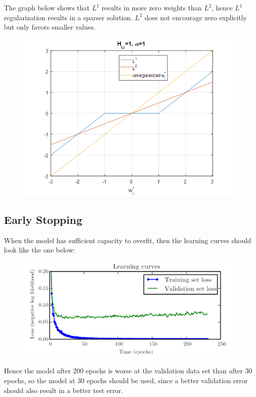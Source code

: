 \begin{multicols}{2}
	The graph below shows that $L^1$ results in more zero weights than $L^2$, hence $L^1$ regularization results in a sparser solution. $L^2$ does not encourage zero explicitly but only favors smaller values.
	\begin{figure}[H]
		\centering
		\includegraphics[width=0.9\linewidth]{images/L1L2.png}
	\end{figure}

	\subsection{Early Stopping}
	When the model has sufficient capacity to overfit, then the learning curves should look like the one below:
	\begin{figure}[H]
		\centering
		\includegraphics[width=0.9\linewidth]{images/earlystopping.png}
	\end{figure}
	Hence the model after 200 epochs is worse at the validation data set than after 30 epochs, so the model at 30 epochs should be used, since a better validation error should also result in a better test error.\\


\end{multicols}
